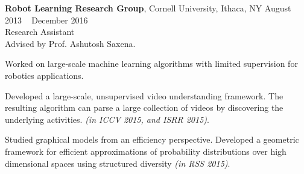    \textbf{Robot Learning Research Group}, Cornell University, Ithaca, NY \hfill August 2013 \textendash ~ December 2016\vspace{0.5mm}\\\vspace{0mm}
    \hspace{-1mm}Research Assistant  \hfill \vspace{0.5mm} \\
  Advised by Prof. Ashutosh Saxena.

Worked on large-scale machine learning algorithms with limited supervision for robotics applications. 

Developed a large-scale, unsupervised video understanding framework. The resulting algorithm can parse a large collection of videos by discovering the underlying activities. \emph{(in ICCV 2015, and ISRR 2015)}.

Studied graphical models from an efficiency perspective. Developed a geometric framework for efficient approximations of probability distributions over high dimensional spaces using structured diversity \emph{(in RSS 2015)}. 

